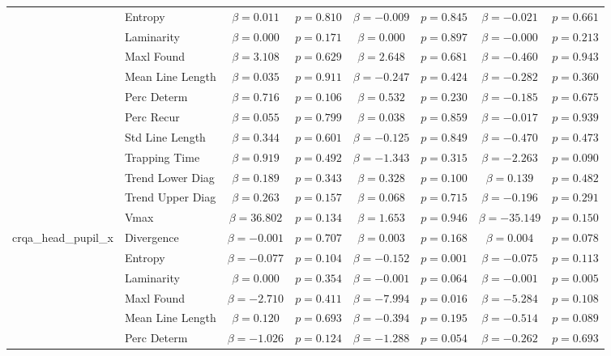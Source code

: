 \begin{tabular}{llcc|cc|cc}
 & Entropy & $\beta = 0.011$ & $p = 0.810$ & $\beta = -0.009$ & $p = 0.845$ & $\beta = -0.021$ & $p = 0.661$ \\
 & Laminarity & $\beta = 0.000$ & $p = 0.171$ & $\beta = 0.000$ & $p = 0.897$ & $\beta = -0.000$ & $p = 0.213$ \\
 & Maxl Found & $\beta = 3.108$ & $p = 0.629$ & $\beta = 2.648$ & $p = 0.681$ & $\beta = -0.460$ & $p = 0.943$ \\
 & Mean Line Length & $\beta = 0.035$ & $p = 0.911$ & $\beta = -0.247$ & $p = 0.424$ & $\beta = -0.282$ & $p = 0.360$ \\
 & Perc Determ & $\beta = 0.716$ & $p = 0.106$ & $\beta = 0.532$ & $p = 0.230$ & $\beta = -0.185$ & $p = 0.675$ \\
 & Perc Recur & $\beta = 0.055$ & $p = 0.799$ & $\beta = 0.038$ & $p = 0.859$ & $\beta = -0.017$ & $p = 0.939$ \\
 & Std Line Length & $\beta = 0.344$ & $p = 0.601$ & $\beta = -0.125$ & $p = 0.849$ & $\beta = -0.470$ & $p = 0.473$ \\
 & Trapping Time & $\beta = 0.919$ & $p = 0.492$ & $\beta = -1.343$ & $p = 0.315$ & $\beta = -2.263$ & $p = 0.090$ \\
 & Trend Lower Diag & $\beta = 0.189$ & $p = 0.343$ & $\beta = 0.328$ & $p = 0.100$ & $\beta = 0.139$ & $p = 0.482$ \\
 & Trend Upper Diag & $\beta = 0.263$ & $p = 0.157$ & $\beta = 0.068$ & $p = 0.715$ & $\beta = -0.196$ & $p = 0.291$ \\
 & Vmax & $\beta = 36.802$ & $p = 0.134$ & $\beta = 1.653$ & $p = 0.946$ & $\beta = -35.149$ & $p = 0.150$ \\
\midrule
\multirow{12}{*}{crqa_head_pupil_x} & Divergence & $\beta = -0.001$ & $p = 0.707$ & $\beta = 0.003$ & $p = 0.168$ & $\beta = 0.004$ & $p = 0.078$ \\
 & Entropy & $\beta = -0.077$ & $p = 0.104$ & $\beta = -0.152$ & $p = 0.001$ & $\beta = -0.075$ & $p = 0.113$ \\
 & Laminarity & $\beta = 0.000$ & $p = 0.354$ & $\beta = -0.001$ & $p = 0.064$ & $\beta = -0.001$ & $p = 0.005$ \\
 & Maxl Found & $\beta = -2.710$ & $p = 0.411$ & $\beta = -7.994$ & $p = 0.016$ & $\beta = -5.284$ & $p = 0.108$ \\
 & Mean Line Length & $\beta = 0.120$ & $p = 0.693$ & $\beta = -0.394$ & $p = 0.195$ & $\beta = -0.514$ & $p = 0.089$ \\
 & Perc Determ & $\beta = -1.026$ & $p = 0.124$ & $\beta = -1.288$ & $p = 0.054$ & $\beta = -0.262$ & $p = 0.693$ \\

\end{tabular}
